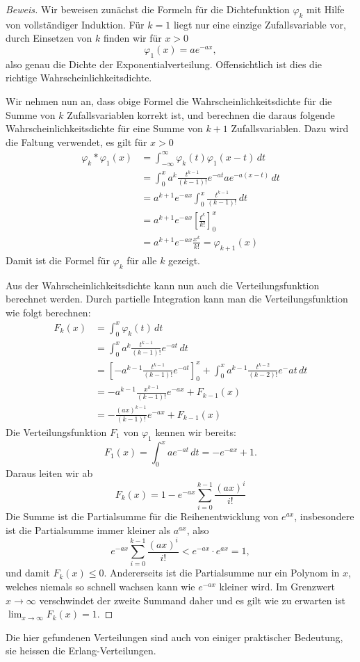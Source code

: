 \begin{proof}[Beweis]
Wir beweisen zunächst die Formeln für die Dichtefunktion $\varphi_k$ mit
Hilfe von vollständiger Induktion.
Für $k=1$ liegt nur eine einzige
Zufallsvariable vor, durch Einsetzen von $k$ finden wir für $x>0$
\[
\varphi_1(x)=ae^{-ax},
\]
also genau die Dichte der Exponentialverteilung.
Offensichtlich ist dies die richtige Wahrscheinlichkeitsdichte.

Wir nehmen nun an, dass obige Formel die Wahrscheinlichkeitsdichte für die
Summe von $k$ Zufallsvariablen korrekt ist, und berechnen die daraus
folgende Wahrscheinlichkeitsdichte für eine Summe von $k+1$ Zufallsvariablen.
Dazu wird die Faltung verwendet, es gilt für $x>0$
\begin{align*}
\varphi_k*\varphi_1(x)
&=
\int_{-\infty}^{\infty}\varphi_k(t)\varphi_1(x-t)\,dt\\
&=\int_0^x a^k\frac{t^{k-1}}{(k-1)!}e^{-at}ae^{-a(x-t)}\,dt\\
&=a^{k+1}e^{-ax}\int_0^x \frac{t^{k-1}}{(k-1)!}\,dt\\
&=a^{k+1}e^{-ax}\left[\frac{t^k}{k!}\right]_0^x\\
&=a^{k+1}e^{-ax}\frac{x^k}{k!}=\varphi_{k+1}(x)
\end{align*}
Damit ist die Formel für $\varphi_k$ für alle $k$ gezeigt.

Aus der Wahrscheinlichkeitsdichte kann nun auch die Verteilungsfunktion
berechnet werden.
Durch partielle Integration kann man die Verteilungsfunktion
wie folgt berechnen:
\begin{align*}
F_k(x)
&=\int_0^x\varphi_k(t)\,dt\\
&=\int_0^xa^k\frac{t^{k-1}}{(k-1)!}e^{-at}\,dt\\
&=\left[-a^{k-1}\frac{t^{k-1}}{(k-1)!}e^{-at}\right]_0^x+\int_0^xa^{k-1}\frac{t^{k-2}}{(k-2)!}e^-at\,dt\\
&=-a^{k-1}\frac{x^{k-1}}{(k-1)!}e^{-ax}+F_{k-1}(x)\\
&=-\frac{(ax)^{k-1}}{(k-1)!}e^{-ax}+F_{k-1}(x)
\end{align*}
Die Verteilungsfunktion $F_1$ von $\varphi_1$ kennen wir bereits:
\[
F_1(x)=\int_0^xae^{-at}\,dt=-e^{-ax}+1.
\]
Daraus leiten wir ab
\[
F_k(x)=1-e^{-ax}\sum_{i=0}^{k-1}\frac{(ax)^i}{i!}
\]
Die Summe ist die Partialsumme für die Reihenentwicklung von $e^{ax}$,
insbesondere ist die Partialsumme immer kleiner als $a^{ax}$, also
\[
e^{-ax}\sum_{i=0}^{k-1}\frac{(ax)^i}{i!}<e^{-ax}\cdot e^{ax}=1,
\]
und damit $F_k(x) \le 0$.
Andererseits ist die Partialsumme nur ein
Polynom in $x$, welches niemals so schnell wachsen kann wie $e^{-ax}$ kleiner
wird.
Im Grenzwert $x\to\infty$ verschwindet der zweite Summand daher und
es gilt wie zu erwarten ist $\lim_{x\to\infty}F_k(x)=1$.
\end{proof}
Die hier gefundenen Verteilungen sind auch von einiger praktischer Bedeutung,
sie heissen die Erlang-Verteilungen.

